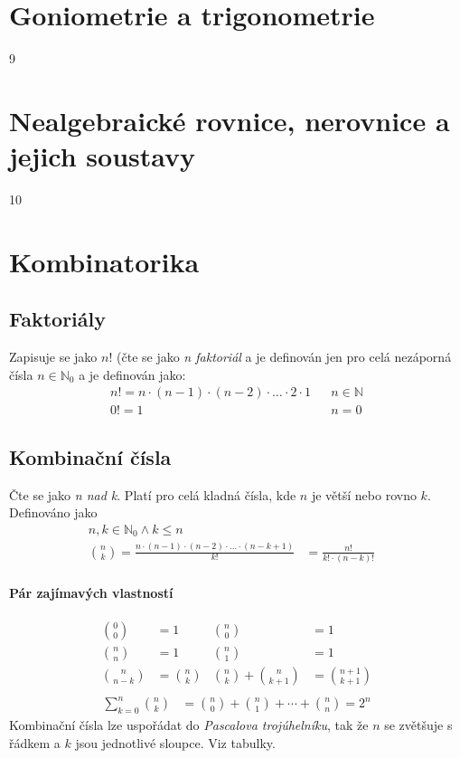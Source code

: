 \documentclass[12pt]{article}
\begin{document}
\section{Goniometrie a trigonometrie}
9

\section{Nealgebraické rovnice, nerovnice a jejich soustavy}
10

\section{Kombinatorika}
\subsection{Faktoriály}
Zapisuje se jako $n!$ (čte se jako \emph{n faktoriál} a je definován jen pro celá nezáporná čísla $n \in \mathbb{N}_0$ a je definován jako:
\begin{align}
n! = n \cdot (n-1) \cdot (n-2) \cdot \dots \cdot 2 \cdot 1 && n \in \mathbb{N}\\
0! = 1 && n=0
\end{align}
\subsection{Kombinační čísla}
Čte se jako \emph{n nad k}. Platí pro celá kladná čísla, kde $n$ je větší nebo rovno $k$. Definováno jako
\begin{align}
n,k \in \mathbb{N}_0 \land k \leq n && \\
\binom{n}{k} = \frac{n \cdot (n-1) \cdot (n-2) \cdot \dotso  \cdot (n-k+1)}{k!} &= \frac{n!}{k! \cdot (n-k)!}
\end{align}
\paragraph{Pár zajímavých vlastností}
\begin{align*}
\binom{0}{0} &= 1 & \binom{n}{0} &=1\\
\binom{n}{n} &= 1 & \binom{n}{1} &=1\\
\binom{n}{n-k} &= \binom{n}{k} & \binom{n}{k} + \binom{n}{k+1} &= \binom{n+1}{k+1}\\
\end{align*}
\begin{align*}
\sum^n_{k=0} \binom{n}{k} &= \binom{n}{0} + \binom{n}{1} + \cdots + \binom{n}{n} = 2^n
\end{align*}
Kombinační čísla lze uspořádat do \emph{Pascalova trojúhelníku}, tak že $n$ se zvětšuje s řádkem a $k$ jsou jednotlivé sloupce. Viz tabulky.
\end{document}

